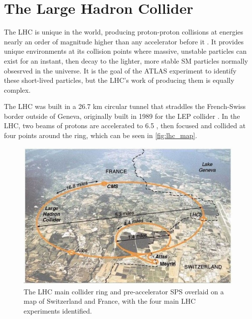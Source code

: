 
\chapter{The Large Hadron Collider} %

\label{ch:lhc} %


The \acf{LHC} is unique in the world, producing proton-proton collisions at energies nearly an order of magnitude higher than any accelerator before it \cite{1748-0221-3-08-S08001}. It provides unique environments at its collision points where massive, unstable particles can exist for an instant, then decay to the lighter, more stable \ac{SM} particles normally obsesrved in the universe. It is the goal of the \ac{ATLAS} experiment to identify these short-lived particles, but the \ac{LHC}'s work of producing them is equally complex. 

The \ac{LHC} was built in a 26.7 km circular tunnel that straddles the French-Swiss border outside of Geneva, originally built in 1989 for the \ac{LEP} collider \cite{lep_tdr}. In the \ac{LHC}, two beams of protons are accelerated to 6.5 \tev, then focused and collided at four points around the ring, which can be seen in \autoref{fig:lhc_map}. 

\begin{centering}
\begin{figure}[!hbt]
\myfloatalign
\includegraphics[width=.90\linewidth]{figures/lhc/lhc-5-640x420.jpg}
\caption{The \ac{LHC} main collider ring and pre-accelerator \ac{SPS} overlaid on a map of Switzerland and France, with the four main \ac{LHC} experiments identified.}
\label{fig:lhc_map}
\end{figure}
\end{centering}


